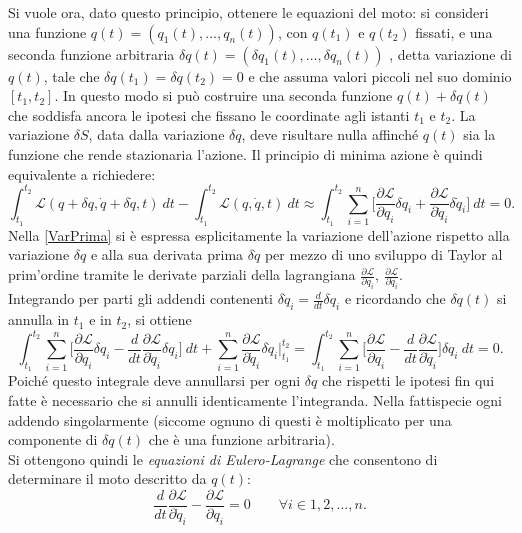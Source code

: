 Si vuole ora, dato questo principio, ottenere le equazioni del moto: si consideri una funzione $q(t)=(q_1(t),...,q_n(t))$, con $q(t_1)$ e $q(t_2)$ fissati, e una seconda funzione arbitraria $\delta q(t)=(\delta q_1(t),...,\delta q_n(t))$ , detta variazione di $q(t)$, tale che $\delta q (t_1)=\delta q(t_2)=0$ e che assuma valori piccoli nel suo dominio $[t_1,t_2]$. In questo modo si può costruire una seconda funzione $q(t)+\delta q(t)$ che soddisfa ancora le ipotesi che fissano le coordinate agli istanti $t_1$ e $ t_2$. 
La variazione $\delta S$, data dalla variazione $\delta q$, deve risultare nulla affinché $q(t)$ sia la funzione che rende stazionaria l'azione. Il principio di minima azione è quindi equivalente a richiedere:
\begin{equation}
    \int_{t_1}^{t_2} \mathcal{L}(q+\delta q,\dot{q}+\delta \dot{q},t)\ dt-\int_{t_1}^{t_2} \mathcal{L}(q,\dot{q},t)\ dt\approx\int_{t_1}^{t_2}\sum_{i=1}^{n}\bigg[\frac{\partial\mathcal{L} }{\partial q_i}\delta q_i+\frac{\partial\mathcal{L} }{\partial \dot{q}_i}\delta \dot{q}_i \bigg]\ dt=0.\label{VarPrima}
\end{equation}
Nella \eqref{VarPrima} si è espressa esplicitamente la variazione dell'azione rispetto alla variazione $\delta q$ e alla sua derivata prima $\delta \dot{q}$ per mezzo di uno sviluppo di Taylor al prim'ordine tramite le derivate parziali della lagrangiana $\frac{\partial\mathcal{L} }{\partial q_i},\ \frac{\partial\mathcal{L} }{\partial \dot{q}_i}$.\\
Integrando per parti gli addendi contenenti $\delta \dot{q}_i=\frac{d}{dt}\delta q_i$ e ricordando che $\delta q (t)$ si annulla in $t_1$ e in $t_2$, si ottiene
\begin{equation*}
    \int_{t_1}^{t_2}\sum_{i=1}^{n}\bigg[\frac{\partial\mathcal{L} }{\partial q_i}\delta q_i-\frac{d}{dt}\frac{\partial\mathcal{L} }{\partial \dot{q}_i}\delta q_i \bigg]\ dt+\sum_{i=1}^n\frac{\partial\mathcal{L} }{\partial \dot q_i}\delta \dot{q}_i\bigg|_{t_1}^{t_2}=\int_{t_1}^{t_2}\sum_{i=1}^{n}\bigg[\frac{\partial\mathcal{L} }{\partial q_i}-\frac{d}{dt}\frac{\partial\mathcal{L} }{\partial \dot{q}_i} \bigg]\delta q_i\ dt=0.
\end{equation*}
Poiché questo integrale deve annullarsi per ogni $\delta q$ che rispetti le ipotesi fin qui fatte è necessario che si annulli identicamente l'integranda. Nella fattispecie ogni addendo singolarmente (siccome ognuno di questi è moltiplicato per una componente di $\delta q(t)$ che è una funzione arbitraria).\\Si ottengono quindi le \emph{equazioni di Eulero-Lagrange} che consentono di determinare il moto descritto da $q(t)$:
\begin{equation}
    \label{eulero-lagrange}
    \frac{d}{dt}\frac{\partial\mathcal{L} }{\partial \dot{q}_i}-\frac{\partial\mathcal{L} }{\partial q_i}=0 \qquad \forall i\in{1,2,...,n}.
\end{equation}


